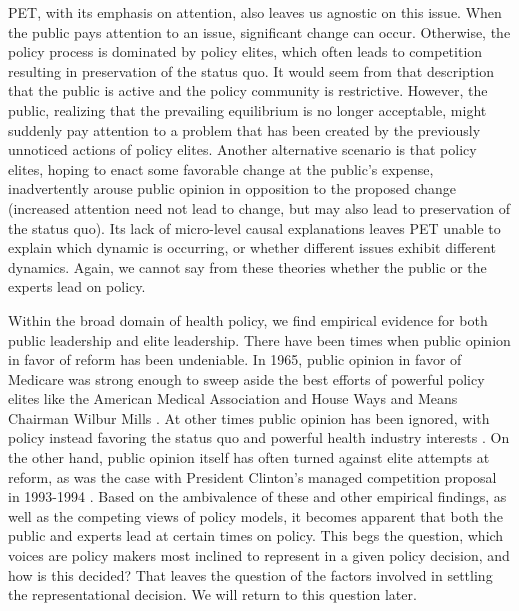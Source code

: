 PET, with its emphasis on attention, also leaves us agnostic on this issue. When the public pays attention to an issue, significant change can occur. Otherwise, the policy process is dominated by policy elites, which often leads to competition resulting in preservation of the status quo. It would seem from that description that the public is active and the policy community is restrictive. However, the public, realizing that the prevailing equilibrium is no longer acceptable, might suddenly pay attention to a problem that has been created by the previously unnoticed actions of policy elites. Another alternative scenario is that policy elites, hoping to enact some favorable change at the public's expense, inadvertently arouse public opinion in opposition to the proposed change (increased attention need not lead to change, but may also lead to preservation of the status quo). Its lack of micro-level causal explanations leaves PET unable to explain which dynamic is occurring, or whether different issues exhibit different dynamics. Again, we cannot say from these theories whether the public or the experts lead on policy.

Within the broad domain of health policy, we find empirical evidence for both public leadership and elite leadership. There have been times when public opinion in favor of reform has been undeniable. In 1965, public opinion in favor of Medicare was strong enough to sweep aside the best efforts of powerful policy elites like the American Medical Association and House Ways and Means Chairman Wilbur Mills \citep{Marmor1970,Jacobs1993}. At other times public opinion has been ignored, with policy instead favoring the status quo and powerful health industry interests \citep{Starr1982,Starr2011}. On the other hand, public opinion itself has often turned against elite attempts at reform, as was the case with President Clinton's managed competition proposal in 1993-1994 \citep{Skocpol1996}. Based on the ambivalence of these and other empirical findings, as well as the competing views of policy models, it becomes apparent that both the public and experts lead at certain times on policy. This begs the question, which voices are policy makers most inclined to represent in a given policy decision, and how is this decided? That leaves the question of the factors involved in settling the representational decision. We will return to this question later.

